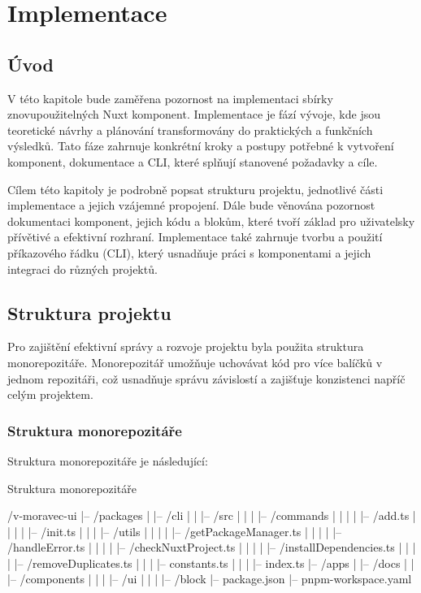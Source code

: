 
\chapter{Implementace}\label{ch:implementation}

\section{Úvod}
V této kapitole bude zaměřena pozornost na implementaci sbírky znovupoužitelných Nuxt komponent. Implementace je fází vývoje, kde jsou teoretické návrhy a plánování transformovány do praktických a funkčních výsledků. Tato fáze zahrnuje konkrétní kroky a postupy potřebné k vytvoření komponent, dokumentace a CLI, které splňují stanovené požadavky a cíle.

Cílem této kapitoly je podrobně popsat strukturu projektu, jednotlivé části implementace a jejich vzájemné propojení. Dále bude věnována pozornost dokumentaci komponent, jejich kódu a blokům, které tvoří základ pro uživatelsky přívětivé a efektivní rozhraní. Implementace také zahrnuje tvorbu a použití příkazového řádku (CLI), který usnadňuje práci s komponentami a jejich integraci do různých projektů.

\section{Struktura projektu}
Pro zajištění efektivní správy a rozvoje projektu byla použita struktura monorepozitáře. Monorepozitář umožňuje uchovávat kód pro více balíčků v jednom repozitáři, což usnadňuje správu závislostí a zajišťuje konzistenci napříč celým projektem.

\clearpage

\subsection{Struktura monorepozitáře}
Struktura monorepozitáře je následující:

\begin{listing}[H]
\caption{Struktura monorepozitáře}
\label{lst:monorepo-structure}
\begin{code}[bash]
/v-moravec-ui
|-- /packages
|   |-- /cli
|   |   |-- /src
|   |   |   |-- /commands
|   |   |   |   |-- /add.ts
|   |   |   |   |-- /init.ts
|   |   |   |-- /utils
|   |   |   |   |-- /getPackageManager.ts
|   |   |   |   |-- /handleError.ts
|   |   |   |   |-- /checkNuxtProject.ts
|   |   |   |   |-- /installDependencies.ts
|   |   |   |   |-- /removeDuplicates.ts
|   |   |   |-- constants.ts
|   |   |   |-- index.ts
|-- /apps
|   |-- /docs
|   |   |-- /components
|   |   |   |-- /ui
|   |   |   |-- /block
|-- package.json
|-- pnpm-workspace.yaml
\end{code}
\end{listing}

